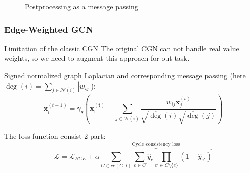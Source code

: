 \documentclass{beamer}
\begin{document}
\begin{frame}
\begin{figure}
        \caption{Postprocessing as a message passing}
    \end{figure}

\end{frame}

\begin{frame}
    \frametitle{Edge-Weighted GCN \cite{jung2022learning}}

    \begin{block}{Limitation of the classic CGN}
        The original CGN can not handle real value weights, so we need to augment this
        approach for out task.
    \end{block}

    Signed normalized graph Laplacian and
    corresponding message passing (here $\overline{\deg}(i) = \sum\limits_{j \in \mathcal{N}(i)} |w_{ij}|$):
    \[
        \mathbf{x}_i^{(t+1)} = \gamma_{\theta} \left(
        \mathbf{x^{(t)}_i} +
        \sum_{j \in \mathcal{N}(i)}
        \frac{w_{ij} \mathbf{x}_j^{(t)}}
        {\sqrt{\overline{\deg}(i)} \sqrt{\overline{\deg}(j)}}
        \right)
    \]

    The loss function consist 2 part:
    \[
        \mathcal{L} = \mathcal{L}_{BCE} + \alpha \overbrace{
            \sum\limits_{C \in cc(G, l)} \sum\limits_{e \in C} \hat{y}_e
            \prod\limits_{e' \in C \setminus \{e\}} (1 - \hat{y}_{e'})
        }^{\text{Cycle consistency loss}}
    \]

\end{frame}
\end{document}
